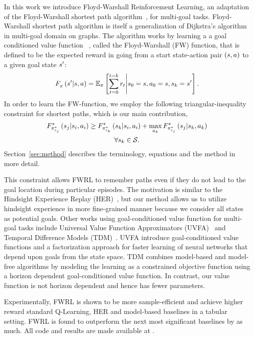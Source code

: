 In this work we introduce Floyd-Warshall Reinforcement Learning, an
adaptation of the Floyd-Warshall shortest path
algorithm~\citep{floydwarshall1962}, for multi-goal tasks.
Floyd-Warshall shortest path algorithm is itself a generalization of
Dijkstra's algorithm in multi-goal domain on graphs. The algorithm works
by learning a a goal conditioned value function
~\citep{schaul2015universal}, called the Floyd-Warshall (FW) function,
that is defined to be the expected reward in going from a start
state-action pair $(\state, \act)$ to a given goal state $\state'$:
%
\begin{align}
\fwargs{\state}{\act}{\state'}{\policy}{} =
\E_{\policy}\left[ \sum_{t=0}^{t=k} \rew_t \middle\vert \state_0 = \state, \act_0 = \state, \state_k = \state' \right] .
\end{align}%
%
In order to learn the FW-function, we employ the following triangular-inequality constraint for shortest paths, which is our main contribution,
%
\begin{multline}
\fwargs{\state_i}{\act_i}{\state_j}{\policy^*_{\state_j}}{*}
 \ge 
  \fwargs{\state_i}{\act_i}{\state_k}{\policy^*_{\state_k}}{*}
  + \max_{\act_k}\fwargs{\state_k}{\act_k}{\state_j}{\policy^*_{\state_j}}{*}
  \\
  \forall \state_k \in \State.
\end{multline}%
%
Section~\ref{sec:method} describes the terminology, equations and the method in more detail.

This constraint allows FWRL to remember paths even if they do not lead to the goal
location during particular episodes. The motivation is similar to the Hindsight
Experience Replay (HER)~\citep{anderson2017vision}, but our method allows us to
utilize hindsight experience in more fine-grained manner because we consider all
states as potential goals. Other works using goal-conditioned value function for
multi-goal tasks include Universal Value Function Approximators
(UVFA)~\citep{schaul2015universal} and Temporal Difference Models
(TDM)~\citep{pong2018temporal}. UVFA introduce goal-conditioned value functions
and a factorization approach for faster learning of neural networks that depend
upon goals from the state space. TDM combines model-based and model-free
algorithms by modeling the learning as a constrained objective function using a
horizon dependent goal-conditioned value function. In contrast, our value
function is not horizon dependent and hence has fewer parameters.


Experimentally, FWRL is shown to be more sample-efficient and achieve
higher reward standard Q-Learning, HER and model-based baselines in a
tabular setting.  FWRL is found to outperform the next most significant
baselines by as much. All code and results are made available at
\href{}{}. 





